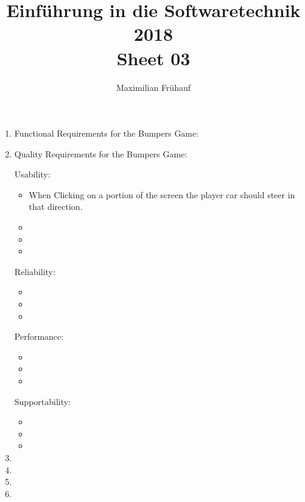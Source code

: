 \documentclass[a4paper, 10pt]{article}
\title{Einführung in die Softwaretechnik 2018 \\ Sheet 03}
\author{Maximilian Frühauf}
\begin{document}
\maketitle
\begin{enumerate}
    \item 
    Functional Requirements for the Bumpers Game:


    \item 
    Quality Requirements for the Bumpers Game:

    Usability:
    \begin{itemize}
        \item When Clicking on a portion of the screen the player car
        should steer in that direction.
        \item
        \item
        \item
    \end{itemize}
    Reliability:
    \begin{itemize}
        \item
        \item
        \item
    \end{itemize}

    Performance:
    \begin{itemize}
        \item
        \item
        \item
    \end{itemize}

    Supportability:
    \begin{itemize}
        \item
        \item
        \item
    \end{itemize}

    \item 
    \item 
    \item 
    \item 
\end{enumerate}
\end{document}
